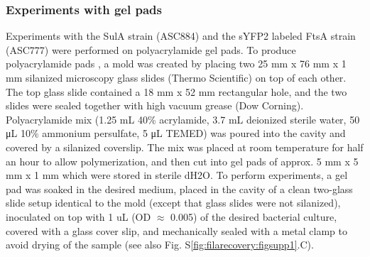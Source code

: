 \subsubsection{Experiments with gel pads}
Experiments with the SulA strain (ASC884) and the sYFP2 labeled FtsA strain (ASC777) were performed on polyacrylamide gel pads. To produce polyacrylamide pads \cite{Kiviet2014}, a mold was created by placing two 25 mm x 76 mm x 1 mm silanized microscopy glass slides (Thermo Scientific) on top of each other. The top glass slide contained a 18 mm x 52 mm rectangular hole, and the two slides were sealed together with high vacuum grease (Dow Corning). 
Polyacrylamide mix (1.25 mL 40\% acrylamide, 3.7 mL deionized sterile water, 50 μL 10\% ammonium persulfate, 5 μL TEMED) was poured into the cavity and covered by a silanized coverslip. 
The mix was placed at room temperature for half an hour to allow polymerization, and then cut into gel pads of approx. 5 mm x 5 mm x 1 mm which were stored in sterile dH2O. 
To perform experiments, a gel pad was soaked in the desired medium, placed in the cavity of a clean two-glass slide setup identical to the mold (except that glass slides were not silanized), inoculated on top with 1 uL (OD $\approx$ 0.005) of the desired bacterial culture, covered with a glass cover slip, and mechanically sealed with a metal clamp to avoid drying of the sample (see also Fig. S\ref{fig:filarecovery:figsupp1}.C).

